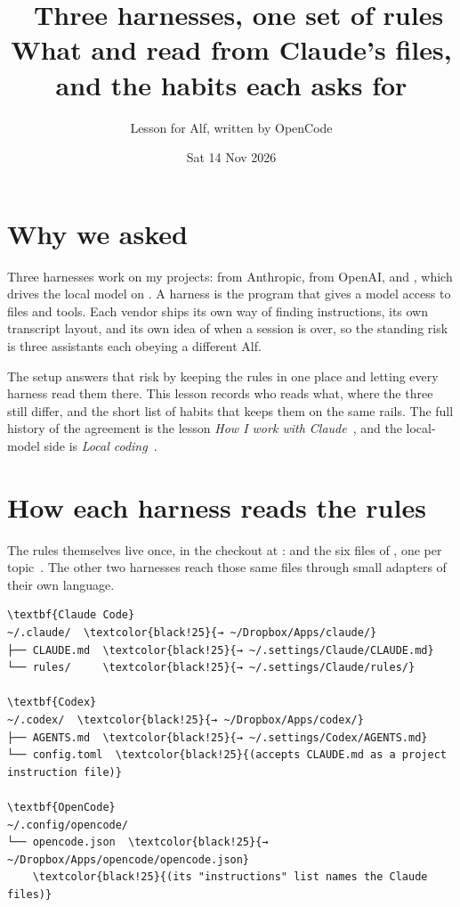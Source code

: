 \documentclass[11pt,a4paper]{article}
\title{\emo{gear}\ Three harnesses, one set of rules\\[0.3em]
  \large What \name{Codex} and \name{OpenCode} read from Claude's files, and the habits each asks for}
\author{Lesson for Alf, written by OpenCode}
\date{Sat 14 Nov 2026}
\newcommand{\home}{\textasciitilde}  %
\newlength{\treewidth}
\begin{document}
\maketitle

\section*{Why we asked}

Three harnesses work on my projects:  from Anthropic,  from OpenAI, and , which drives the local model on . A harness is the program that gives a model access to files and tools. Each vendor ships its own way of finding instructions, its own transcript layout, and its own idea of when a session is over, so the standing risk is three assistants each obeying a different Alf.

The setup answers that risk by keeping the rules in one place and letting every harness read them there. This lesson records who reads what, where the three still differ, and the short list of habits that keeps them on the same rails. The full history of the agreement is the lesson \emph{How I work with Claude}~\cite{wwc}, and the local-model side is \emph{Local coding}~\cite{lc}.

\section{How each harness reads the rules}

The rules themselves live once, in the  checkout at \name{\home/\lk{.settings}/}:  and the six files of , one per topic~\cite{dots}. The other two harnesses reach those same files through small adapters of their own language.

\begin{Verbatim}[fontsize=\fontsize{7}{8.4}, formatcom=\treefont, commandchars=\\\{\}, xleftmargin=\dimexpr(\textwidth-\treewidth)/2\relax]
\textbf{Claude Code}
~/.claude/  \textcolor{black!25}{→ ~/Dropbox/Apps/claude/}
├── CLAUDE.md  \textcolor{black!25}{→ ~/.settings/Claude/CLAUDE.md}
└── rules/     \textcolor{black!25}{→ ~/.settings/Claude/rules/}

\textbf{Codex}
~/.codex/  \textcolor{black!25}{→ ~/Dropbox/Apps/codex/}
├── AGENTS.md  \textcolor{black!25}{→ ~/.settings/Codex/AGENTS.md}
└── config.toml  \textcolor{black!25}{(accepts CLAUDE.md as a project instruction file)}

\textbf{OpenCode}
~/.config/opencode/
└── opencode.json  \textcolor{black!25}{→ ~/Dropbox/Apps/opencode/opencode.json}
    \textcolor{black!25}{(its "instructions" list names the Claude files)}
\end{Verbatim}
\end{document}
